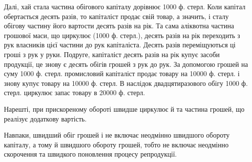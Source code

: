 Далі, хай стала частина обігового капіталу дорівнює 1000 ф. стерл.
Коли капітал обертається десять разів, то капіталіст продає свій товар, а
значить, і сталу обігову частину його вартости десять разів на рік. Та
сама аліквотна частина грошової маси, що циркулює (1000 ф. стерл.),
десять разів на рік переходить з рук власників цієї частини до рук капіталіста.
Десять разів переміщуються ці гроші з рук у руки. Подруге,
капіталіст десять разів на рік купує засоби продукції, це знову є десять
обігів грошей з рук до рук. За допомогою грошей на суму 1000 ф. стерл.
промисловий капіталіст продає товару на 10000 ф. стерл. і знову купує
товару на 10000 ф. стерл. В наслідок двадцятиразового обігу 1000 ф. стерл.
циркулює запас товару в 20000 ф. стерл.

Нарешті, при прискореному обороті швидше циркулює й та частина
грошей, що реалізує додаткову вартість.

Навпаки, швидший обіг грошей і не включає неодмінно швидшого обороту
капіталу, а тому й швидшого обороту грошей, тобто не включає
неодмінно скорочення та швидкого поновлення процесу репродукції.
